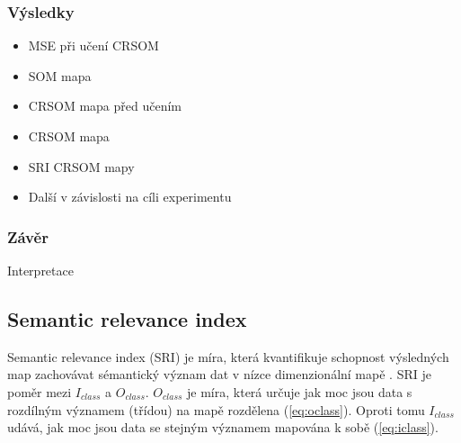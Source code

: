 \documentclass[thesis=M,czech]{FITthesis}[2012/06/26]
\begin{document}
\subsubsection*{Výsledky}

    \begin{itemize}
        \item MSE při učení CRSOM
        \item SOM mapa
        \item CRSOM mapa před učením
        \item CRSOM mapa
        \item SRI CRSOM mapy
        \item Další v závislosti na cíli experimentu
    \end{itemize}

\subsubsection*{Závěr}
Interpretace


\subsection{Semantic relevance index}
Semantic relevance index (SRI) je míra, která kvantifikuje schopnost výsledných map zachovávat sémantický význam dat v nízce dimenzionální mapě \cite{hartono14}. SRI je poměr mezi $I_{class}$ a $O_{class}$. $O_{class}$ je míra, která určuje jak moc jsou data s rozdílným významem (třídou) na mapě rozdělena (\ref{eq:oclass}). Oproti tomu $I_{class}$ udává, jak moc jsou data se stejným významem mapována k sobě (\ref{eq:iclass}).
\end{document}
